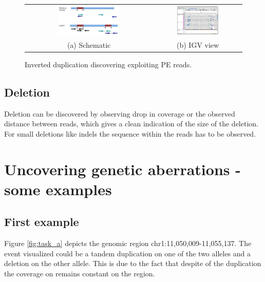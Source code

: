     \begin{figure}[H]
        \begin{tabular}{cc}
            \includegraphics[width=0.5\textwidth]{inverted.png} &   \includegraphics[width=0.5\textwidth]{inverted_igv.png} \\
            (a) Schematic & (b) IGV view \\[6pt]
        \end{tabular}
        \caption{Inverted duplication discovering exploiting PE reads.}
        \label{fig:inverted}
    \end{figure}

    \subsection{Deletion}
    Deletion can be discovered by observing drop in coverage or the observed distance between reads, which gives a clean indication of the size of the deletion.
    For small deletions like indels the sequence within the reads has to be observed.

\section{Uncovering genetic aberrations - some examples}

    \subsection{First example}
    Figure \ref{fig:task_a} depicts the genomic region chr1:11,050,009-11,055,137.
    The event visualized could be a tandem duplication on one of the two alleles and a deletion on the other allele.
    This is due to the fact that despite of the duplication the coverage on remains constant on the region.

